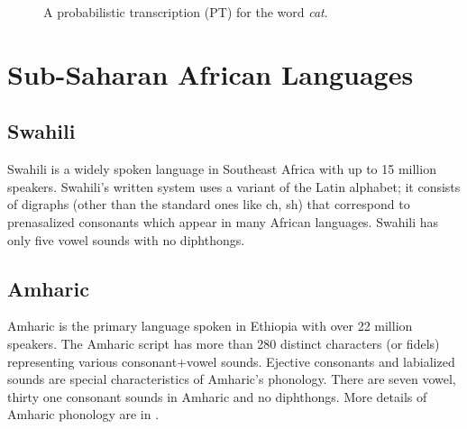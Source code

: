 \documentclass[a4paper]{article}
\newcommand{\mytikzscale}{0.9}
\newcommand{\myvspacefig}{\vspace{-4mm}}
\begin{document}
\begin{figure}
\begin{subfigure}
  \myvspacefig
  \caption{A probabilistic transcription (PT) for the word \emph{cat}.}
  \label{fig:pt}
  \end{subfigure}%
  \vspace{-1mm}
\end{figure}

\section{Sub-Saharan African Languages}  \vspace{-1mm}
\label{sec:Sub-Saharan African Languages}
\subsection{Swahili} 
Swahili is a widely spoken language in Southeast Africa with up to 15 million speakers. Swahili's written system uses a variant of the Latin alphabet; it consists of digraphs (other than the standard ones like ch, sh) that correspond to prenasalized consonants which appear in many African languages. Swahili has only five vowel sounds with no diphthongs. 

\subsection{Amharic}  
Amharic is the primary language spoken in Ethiopia with over 22 million speakers. The Amharic script has more than 280 distinct characters (or fidels) representing various consonant+vowel sounds. Ejective consonants and labialized sounds are special characteristics of Amharic's phonology. There are seven vowel, thirty one consonant sounds in Amharic and no diphthongs. More details of Amharic phonology are in \cite{Tachbelie2014}.
\end{document}
